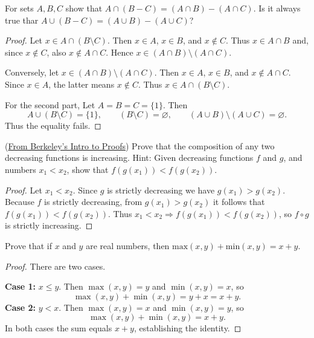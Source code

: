 \documentclass[12pt]{article}
\begin{document}
\begin{problem}
For sets $A,B,C$ show that $A \cap (B - C) = (A \cap B) - (A \cap C)$. Is it always true thar $A \cup (B - C) = (A \cup B) - (A \cup C)$?

\begin{proof}
Let \(x \in A \cap (B \setminus C)\). Then \(x \in A\), \(x \in B\), and \(x \notin C\).
Thus \(x \in A \cap B\) and, since \(x \notin C\), also \(x \notin A \cap C\).
Hence \(x \in (A \cap B) \setminus (A \cap C)\).

Conversely, let \(x \in (A \cap B) \setminus (A \cap C)\). Then \(x \in A\), \(x \in B\),
and \(x \notin A \cap C\). Since \(x \in A\), the latter means \(x \notin C\).
Thus \(x \in A \cap (B \setminus C)\).

For the second part, Let \(A = B = C = \{1\}\). Then
\[
A \cup (B \setminus C) = \{1\}, \qquad
(B \setminus C) = \varnothing, \qquad
(A \cup B) \setminus (A \cup C) = \varnothing.
\]
Thus the equality fails.
\end{proof}
\end{problem}

\begin{problem}
(\href{https://math.berkeley.edu/~willij/1a/proof-practice.pdf}{From Berkeley's Intro to Proofs}) Prove that the composition of any two decreasing functions is increasing. Hint:  Given decreasing functions $f$ and $g$, and numbers $x_1 < x_2$, show that $f(g(x_1)) < f(g(x_2))$.

\begin{proof}
Let \(x_1<x_2\). Since \(g\) is strictly decreasing we have \(g(x_1)>g(x_2)\).
Because \(f\) is strictly decreasing, from \(g(x_1)>g(x_2)\) it follows that
\(f(g(x_1))<f(g(x_2))\).
Thus \(x_1<x_2\Rightarrow f(g(x_1))<f(g(x_2))\), so \(f\circ g\) is strictly increasing.
\end{proof}
\end{problem}

\begin{problem}
Prove that if $x$ and $y$ are real numbers, then $\text{max}(x, y) + \text{min}(x, y) = x + y$.

\begin{proof}
There are two cases.

\textbf{Case 1:} \(x\le y\).  
Then \(\max(x,y)=y\) and \(\min(x,y)=x\), so
\[
\max(x,y)+\min(x,y)=y+x=x+y.
\]
\textbf{Case 2:} \(y< x\).  
Then \(\max(x,y)=x\) and \(\min(x,y)=y\), so
\[
\max(x,y)+\min(x,y)=x+y.
\]
In both cases the sum equals \(x+y\), establishing the identity.
\end{proof}    
\end{problem}
\end{document}
